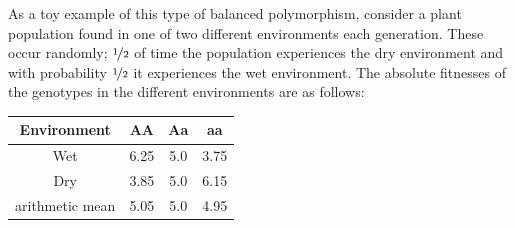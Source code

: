 As a toy example of this type of balanced polymorphism, consider a plant population found in one of two different environments each
generation. These occur randomly; $\nicefrac{1}{2}$ of time the population
experiences the dry environment and with probability $\nicefrac{1}{2}$ it
experiences the wet environment. The absolute fitnesses of the genotypes in the different environments
are as follows:
\begin{center}
\begin{tabular}{cccc} 
Environment & AA & Aa & aa \\
\hline 
Wet & 6.25 & 5.0 & 3.75 \\
  Dry & 3.85 & 5.0 & 6.15\\
arithmetic mean & 5.05 & 5.0 & 4.95\\
\end{tabular}
\end{center}
